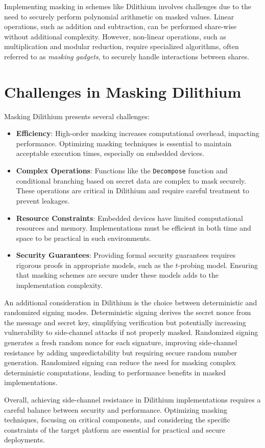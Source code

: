Implementing masking in schemes like Dilithium involves challenges due to the need to securely perform polynomial arithmetic on masked values. Linear operations, such as addition and subtraction, can be performed share-wise without additional complexity. However, non-linear operations, such as multiplication and modular reduction, require specialized algorithms, often referred to as \emph{masking gadgets}, to securely handle interactions between shares.

\section{Challenges in Masking Dilithium}

Masking Dilithium presents several challenges:

\begin{itemize}
    \item \textbf{Efficiency}: High-order masking increases computational overhead, impacting performance. Optimizing masking techniques is essential to maintain acceptable execution times, especially on embedded devices.
    \item \textbf{Complex Operations}: Functions like the \texttt{Decompose} function and conditional branching based on secret data are complex to mask securely. These operations are critical in Dilithium and require careful treatment to prevent leakages.
    \item \textbf{Resource Constraints}: Embedded devices have limited computational resources and memory. Implementations must be efficient in both time and space to be practical in such environments.
    \item \textbf{Security Guarantees}: Providing formal security guarantees requires rigorous proofs in appropriate models, such as the $t$-probing model. Ensuring that masking schemes are secure under these models adds to the implementation complexity.
\end{itemize}

An additional consideration in Dilithium is the choice between deterministic and randomized signing modes. Deterministic signing derives the secret nonce from the message and secret key, simplifying verification but potentially increasing vulnerability to side-channel attacks if not properly masked. Randomized signing generates a fresh random nonce for each signature, improving side-channel resistance by adding unpredictability but requiring secure random number generation. Randomized signing can reduce the need for masking complex deterministic computations, leading to performance benefits in masked implementations.

Overall, achieving side-channel resistance in Dilithium implementations requires a careful balance between security and performance. Optimizing masking techniques, focusing on critical components, and considering the specific constraints of the target platform are essential for practical and secure deployments.
